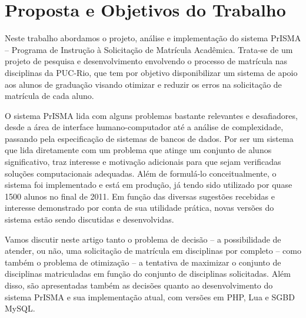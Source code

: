 
\chapter{Proposta e Objetivos do Trabalho}

Neste trabalho abordamos o projeto, análise e implementação do sistema PrISMA – Programa de Instrução à Solicitação de Matrícula Acadêmica. Trata-se de um projeto de pesquisa e desenvolvimento envolvendo o processo de matrícula nas disciplinas da PUC-Rio, que tem por objetivo disponibilizar um sistema de apoio aos alunos de graduação visando otimizar e reduzir os erros na solicitação de matrícula de cada aluno.

O sistema PrISMA lida com alguns problemas bastante relevantes e desafiadores, desde a área de interface humano-computador até a análise de complexidade, passando pela especificação de sistemas de bancos de dados. Por ser um sistema que lida diretamente com um problema que atinge um conjunto de alunos significativo, traz interesse e motivação adicionais para que sejam verificadas soluções computacionais adequadas. Além de formulá-lo conceitualmente, o sistema foi implementado e está em produção, já tendo sido utilizado por quase 1500 alunos no final de 2011. Em função das diversas sugestões recebidas e interesse demonstrado por conta de sua utilidade prática, novas versões do sistema estão sendo discutidas e desenvolvidas.

Vamos discutir neste artigo tanto o problema de decisão – a possibilidade de atender, ou não, uma solicitação de matrícula em disciplinas por completo – como também o problema de otimização – a tentativa de maximizar o conjunto de disciplinas matriculadas em função do conjunto de disciplinas solicitadas. Além disso, são apresentadas também as decisões quanto ao desenvolvimento do sistema PrISMA e sua implementação atual, com versões em PHP, Lua e SGBD MySQL.
